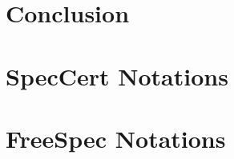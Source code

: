 \documentclass[
11pt, %
english, %
singlespacing, %
headsepline, %
]{MastersDoctoralThesis} %
\begin{document}


\mainmatter %

\pagestyle{thesis} %












\chapter{Conclusion}


\appendix %


\chapter{SpecCert Notations}

\chapter{FreeSpec Notations}

%
%
%


\printbibliography[heading=bibintoc]

\end{document}
